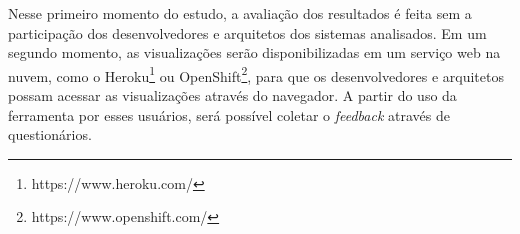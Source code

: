 Nesse primeiro momento do estudo, a avaliação dos resultados é feita sem a participação dos desenvolvedores e arquitetos dos sistemas analisados. Em um segundo momento, as visualizações serão disponibilizadas em um serviço web na nuvem, como o Heroku\footnote{https://www.heroku.com/} ou OpenShift\footnote{https://www.openshift.com/}, para que os desenvolvedores e arquitetos possam acessar as visualizações através do navegador. A partir do uso da ferramenta por esses usuários, será possível coletar o \textit{feedback} através de questionários.